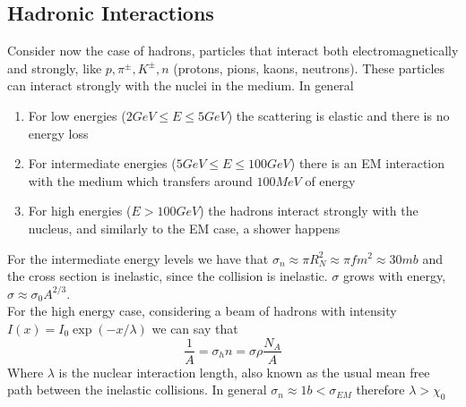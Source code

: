\documentclass[../qm.tex]{subfiles}
\begin{document}
\subsection{Hadronic Interactions}
Consider now the case of hadrons, particles that interact both electromagnetically and strongly, like $p,\pi^{\pm},K^{\pm},n$ (protons, pions, kaons, neutrons). These particles can interact strongly with the nuclei in the medium. In general
\begin{enumerate}
\item For low energies ($2\unit{GeV}\le E\le5\unit{GeV}$) the scattering is elastic and there is no energy loss
\item For intermediate energies ($5\unit{GeV}\le E\le100\unit{GeV}$) there is an EM interaction with the medium which transfers around $100\unit{MeV}$ of energy
\item For high energies ($E>100\unit{GeV}$) the hadrons interact strongly with the nucleus, and similarly to the EM case, a shower happens
\end{enumerate}
For the intermediate energy levels we have that $\sigma_n\approx\pi R_N^2\approx\pi\unit{fm^2}\approx30\unit{mb}$ and the cross section is inelastic, since the collision is inelastic. $\sigma$ grows with energy, $\sigma\approx\sigma_0A^{2/3}$.\\
For the high energy case, considering a beam of hadrons with intensity $I(x)=I_0\exp(-x/\lambda)$ we can say that
\begin{equation*}
	\frac{1}{A}=\sigma_hn=\sigma\rho\frac{N_A}{A}
\end{equation*}
Where $\lambda$ is the nuclear interaction length, also known as the usual mean free path between the inelastic collisions. In general $\sigma_n\approx1\unit{b}<\sigma_{EM}$ therefore $\lambda>\chi_0$
\end{document}
